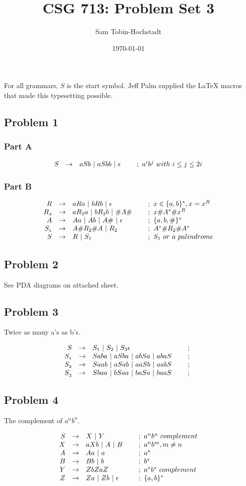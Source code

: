 \documentclass[12pt]
{article}
\title{CSG 713: Problem Set 3}
\author{Sam Tobin-Hochstadt}
\date{\today}
\newcommand\mygrammar[1]{
$$
\begin{array}{rcll}
#1
\end{array}
$$
}
\newcommand\gr[3]{\ensuremath{{\mit #1} &\rightarrow& #2 & ~~~~;~#3} \\}
\def\por{~|~}
\def\mt{\mathtt}
\def\h{\ensuremath{\mt{\#}}}
\begin{document}
\maketitle

For all grammars, $S$ is the start symbol.  Jeff Palm supplied the
\LaTeX{} macros that made this typesetting possible.  

\subsection*{Problem 1}

\subsubsection*{Part A}

\mygrammar{  
  \gr{S}{aSb  \por aSbb \por \epsilon}{a^i b^j ~with~ i \leq j \leq 2i}  
}

\subsubsection*{Part B}

\mygrammar{
  \gr{R}{aRa \por bRb \por \epsilon}{x \in \{a,b\}^*, x = x^R}
  \gr{R_2}{aR_2a \por bR_2b \por \h A\h}{x\h A^*\h x^R}
  \gr{A}{Aa \por Ab \por A\h \por \epsilon}{\{a,b,\h\}^*}
  \gr{S_1}{A\h R_2\h A \por R_2}{A^*\h R_2\h A^*}
  \gr{S}{R \por S_1}{S_1 ~or ~a ~palindrome}
}

\subsection*{Problem 2}

See PDA diagrams on attached sheet.  

\subsection*{Problem 3}
Twice as many a's as b's.
 \mygrammar{
   \gr{S}{ S_1 \por S_2 \por S_3 \epsilon }{}
   \gr{S_1}{Saba \por aSba \por abSa \por abaS}{}
   \gr{S_2}{Saab \por aSab \por aaSb \por aabS}{}
   \gr{S_3}{Sbaa \por bSaa \por baSa \por baaS}{}
}

\subsection*{Problem 4}
The complement of $a^nb^n$.

\mygrammar{
  \gr{S}{X \por Y}{a^nb^n~ complement}
  \gr{X}{aXb \por A \por B}{a^nb^m, m \neq n}
  \gr{A}{Aa \por a}{a^*}
  \gr{B}{Bb \por b}{b^*}
  \gr{Y}{ZbZaZ}{a^*b^* ~complement}
  \gr{Z}{Za \por Zb \por \epsilon}{\{a,b\}^*}
}
\end{document}
